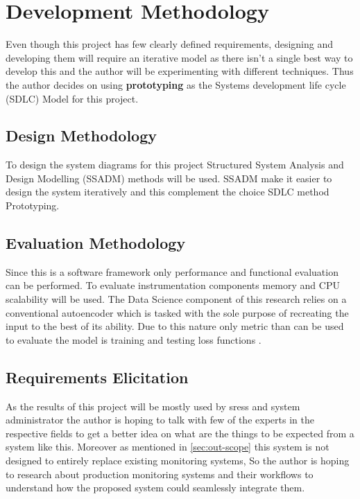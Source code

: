 \section{Development Methodology}

Even though this project has few clearly defined requirements, designing and developing them will require an iterative model as there isn't a single best way to develop this and the author will be experimenting with different techniques. Thus the author decides on using \textbf{prototyping} as the Systems development life cycle (SDLC) Model for this project.\\

\subsection{Design Methodology}

To design the system diagrams for this project Structured System Analysis and Design Modelling (SSADM) methods will be used. SSADM make it easier to design the system iteratively and this complement the choice SDLC method Prototyping.

\subsection{Evaluation Methodology}

Since this is a software framework only performance and functional evaluation can be performed. To evaluate instrumentation components memory and CPU scalability will be used. The Data Science component of this research relies on a conventional autoencoder which is tasked with the sole purpose of recreating the input to the best of its ability. Due to this nature only metric than can be used to evaluate the model is training and testing loss functions \citep{gondara2016medical}. 

\subsection{Requirements Elicitation}

As the results of this project will be mostly used by \acp{sres} and system administrator the author is hoping to talk with few of the experts in the respective fields to get a better idea on what are the things to be expected from a system like this. Moreover as mentioned in \ref{sec:out-scope} this system is not designed to entirely replace existing monitoring systems, So the author is hoping to research about production monitoring systems and their workflows to understand how the proposed system could seamlessly integrate them. 
